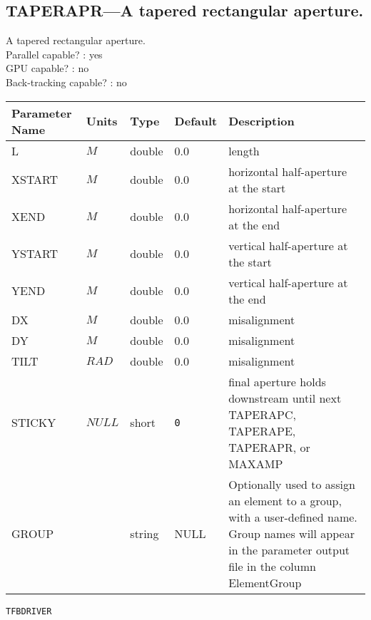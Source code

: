 \subsection{TAPERAPR---A tapered rectangular aperture.}
A tapered rectangular aperture.
\\
Parallel capable? : yes\\
GPU capable? : no\\
Back-tracking capable? : no\\
\begin{tabular}{|l|l|l|l|p{\descwidth}|} \hline
Parameter Name & Units & Type & Default & Description \\ \hline 
L & $M$ & double &  0.0 & length  \\ \hline 
XSTART & $M$ & double &  0.0 & horizontal half-aperture at the start  \\ \hline 
XEND & $M$ & double &  0.0 & horizontal half-aperture at the end  \\ \hline 
YSTART & $M$ & double &  0.0 & vertical half-aperture at the start  \\ \hline 
YEND & $M$ & double &  0.0 & vertical half-aperture at the end  \\ \hline 
DX & $M$ & double &  0.0 & misalignment  \\ \hline 
DY & $M$ & double &  0.0 & misalignment  \\ \hline 
TILT & $RAD$ & double &  0.0 & misalignment  \\ \hline 
STICKY & $NULL$ & short &  \verb|0| & final aperture holds downstream until next TAPERAPC, TAPERAPE, TAPERAPR, or MAXAMP  \\ \hline 
GROUP &  & string & NULL & Optionally used to assign an element to a group, with a user-defined name.  Group names will appear in the parameter output file in the column ElementGroup  \\ \hline 
\end{tabular}

\newpage
\begin{center}{\Large\verb|TFBDRIVER|}\end{center}
